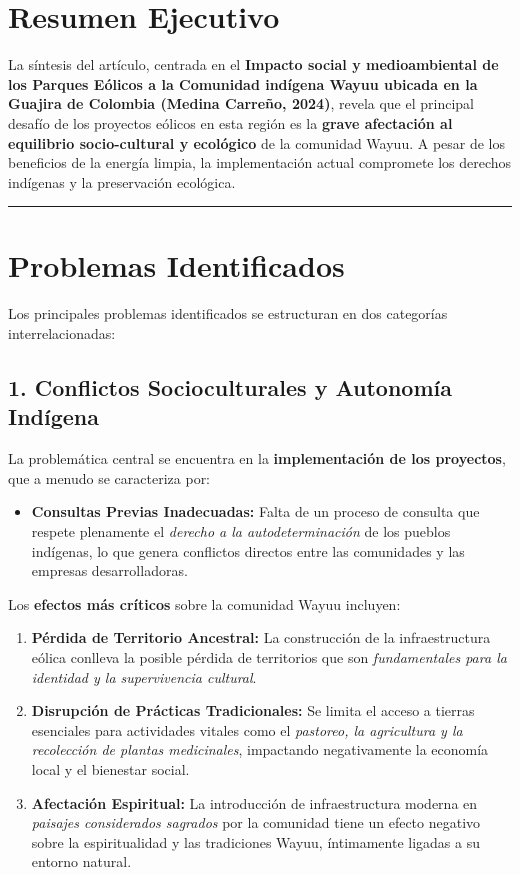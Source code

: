 \section*{Resumen Ejecutivo}

La síntesis del artículo, centrada en el \textbf{Impacto social y medioambiental de los Parques Eólicos a la Comunidad indígena Wayuu ubicada en la Guajira de Colombia (Medina Carreño, 2024)}, revela que el principal desafío de los proyectos eólicos en esta región es la \textbf{grave afectación al equilibrio socio-cultural y ecológico} de la comunidad Wayuu. A pesar de los beneficios de la energía limpia, la implementación actual compromete los derechos indígenas y la preservación ecológica.

\hrule

\section{Problemas Identificados}

Los principales problemas identificados se estructuran en dos categorías interrelacionadas:

\subsection{1. Conflictos Socioculturales y Autonomía Indígena}

La problemática central se encuentra en la \textbf{implementación de los proyectos}, que a menudo se caracteriza por:
\begin{itemize}
    \item \textbf{Consultas Previas Inadecuadas:} Falta de un proceso de consulta que respete plenamente el \textit{derecho a la autodeterminación} de los pueblos indígenas, lo que genera conflictos directos entre las comunidades y las empresas desarrolladoras.
\end{itemize}

Los \textbf{efectos más críticos} sobre la comunidad Wayuu incluyen:

\begin{enumerate}
    \item \textbf{Pérdida de Territorio Ancestral:} La construcción de la infraestructura eólica conlleva la posible pérdida de territorios que son \textit{fundamentales para la identidad y la supervivencia cultural}.
    \item \textbf{Disrupción de Prácticas Tradicionales:} Se limita el acceso a tierras esenciales para actividades vitales como el \textit{pastoreo, la agricultura y la recolección de plantas medicinales}, impactando negativamente la economía local y el bienestar social.
    \item \textbf{Afectación Espiritual:} La introducción de infraestructura moderna en \textit{paisajes considerados sagrados} por la comunidad tiene un efecto negativo sobre la espiritualidad y las tradiciones Wayuu, íntimamente ligadas a su entorno natural.
\end{enumerate}

